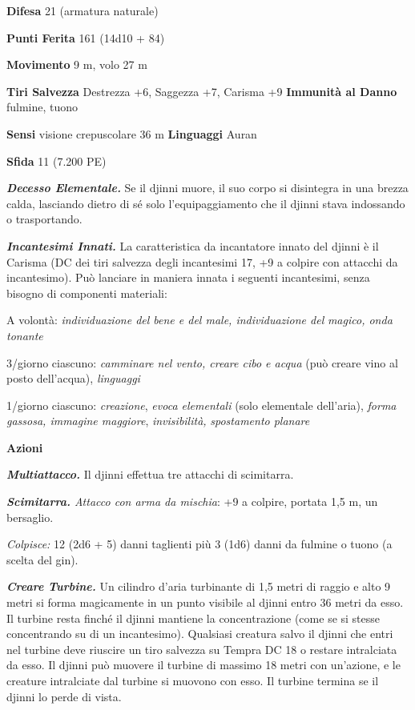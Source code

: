 \begin{multicols}{2}
\textbf{Difesa} 21 (armatura naturale)

\textbf{Punti Ferita} 161 (14d10 + 84)

\textbf{Movimento} 9 m, volo 27 m

\textbf{Tiri Salvezza} Destrezza +6, Saggezza +7, Carisma +9
\textbf{Immunità al Danno} fulmine, tuono

\textbf{Sensi} visione crepuscolare 36 m
\textbf{Linguaggi} Auran

\textbf{Sfida} 11 (7.200 PE)

\emph{\textbf{Decesso Elementale.}} Se il djinni muore, il suo corpo si
disintegra in una brezza calda, lasciando dietro di sé solo
l'equipaggiamento che il djinni stava indossando o trasportando.

\emph{\textbf{Incantesimi Innati.}} La caratteristica da incantatore
innato del djinni è il Carisma (DC dei tiri salvezza degli incantesimi
17, +9 a colpire con attacchi da incantesimo). Può lanciare in maniera
innata i seguenti incantesimi, senza bisogno di componenti materiali:

A volontà: \emph{individuazione del bene e del male, individuazione del}
\emph{magico, onda tonante}

3/giorno ciascuno: \emph{camminare nel vento, creare cibo e acqua} (può
creare vino al posto dell'acqua), \emph{linguaggi}

1/giorno ciascuno: \emph{creazione}, \emph{evoca elementali} (solo
elementale dell'aria), \emph{forma gassosa, immagine maggiore},
\emph{invisibilità,} \emph{spostamento planare}

\textbf{Azioni}

\emph{\textbf{Multiattacco.}} Il djinni effettua tre attacchi di
scimitarra.

\emph{\textbf{Scimitarra.} Attacco con arma da mischia}: +9 a colpire,
portata 1,5 m, un bersaglio.

\emph{Colpisce:} 12 (2d6 + 5) danni taglienti più 3 (1d6) danni da
fulmine o tuono (a scelta del gin).

\emph{\textbf{Creare Turbine.}} Un cilindro d'aria turbinante di 1,5
metri di raggio e alto 9 metri si forma magicamente in un punto visibile
al djinni entro 36 metri da esso. Il turbine resta finché il djinni
mantiene la concentrazione (come se si stesse concentrando su di un
incantesimo). Qualsiasi creatura salvo il djinni che entri nel turbine
deve riuscire un tiro salvezza su Tempra DC 18 o restare intralciata da
esso. Il djinni può muovere il turbine di massimo 18 metri con
un'azione, e le creature intralciate dal turbine si muovono con esso. Il
turbine termina se il djinni lo perde di vista.


\end{multicols}

